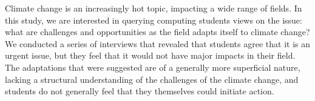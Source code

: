 
Climate change is an increasingly hot topic, impacting a wide range of fields. In this study, we are interested in querying computing students views on the issue: what are challenges and opportunities as the field adapts itself to climate change? We conducted a series of interviews that revealed that students agree that it is an urgent issue, but they feel that it would not have major impacts in their field. The adaptations that were suggested are of a generally more superficial nature, lacking a structural understanding of the challenges of the climate change, and students do not generally feel that they themselves could initiate action.